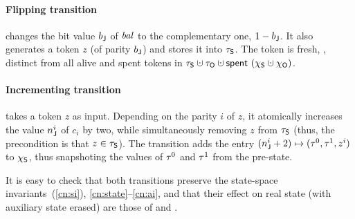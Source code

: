 \paragraph{Flipping transition}
%
changes the bit value $b_{\mathsf{J}}$ of $\mathit{bal}$ to the complementary one,
$1 - b_{\mathsf{J}}$.
%
It also generates a token $z$ (of parity $b_{\mathsf{J}}$) and stores it
into $\tau_{\mathsf{S}}$. The token is fresh, \ie, distinct from all alive and
spent tokens in $\tkns \hunion \tkno \hunion{\Tomb~(\hists
  \hunion \histo)}$.
%
\paragraph{Incrementing transition}
%
takes a token $z$ as input. Depending on the parity $i$ of $z$, it
atomically increases the value $n^i_{\mathsf{J}}$ of $c_i$ by two, while
simultaneously removing $z$ from $\tau_{\mathsf{S}}$ (thus, the precondition is
that $z \in \tau_{\mathsf{S}}$). The transition adds the entry $(n^i_{\mathsf{J}} + 2)
\mapsto (\tau^0, \tau^1, z^i)$ to $\chi_{\mathsf{S}}$, thus snapshoting the values
of $\tau^0$ and $\tau^1$ from the pre-state.
%

%
It is easy to check that both transitions preserve the state-space
invariants~(\ref{cn:si}), \ref{cn:state}--\ref{cn:ai}, and that their
effect on real state (with auxiliary state erased) are those of
 and .

